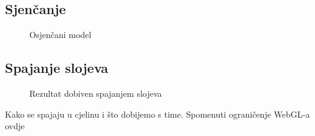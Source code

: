 \subsection{Sjenčanje}

\begin{figure}[H]
\caption{Osjenčani model}
\label{fig:monkey-toon}
\begin{center}
\end{center}
\end{figure}

\subsection{Spajanje slojeva}

\begin{figure}[H]
\caption{Rezultat dobiven spajanjem slojeva}
\label{fig:monkey-final}
\begin{center}
\end{center}
\end{figure}

Kako se spajaju u cjelinu i što dobijemo s time. Spomenuti ograničenje WebGL-a ovdje